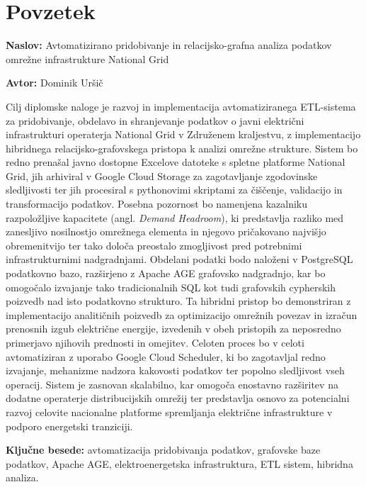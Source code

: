 \documentclass[a4paper,12pt,openright]{book}
\newcommand{\ttitle}{Avtomatizirano pridobivanje in relacijsko-grafna analiza podatkov omrežne infrastrukture National Grid}
\newcommand{\tauthor}{Dominik Uršič}
\newcommand{\tkeywords}{avtomatizacija pridobivanja podatkov, grafovske baze podatkov, Apache AGE, elektroenergetska infrastruktura, ETL sistem, hibridna analiza}
\newcommand{\clearemptydoublepage}{\newpage{\pagestyle{empty}\cleardoublepage}}
\begin{document}
{}
\chapter*{Povzetek}

\noindent\textbf{Naslov:} \ttitle
\bigskip

\noindent\textbf{Avtor:} \tauthor
\bigskip

\noindent Cilj diplomske naloge je razvoj in implementacija avtomatiziranega ETL-sistema za pridobivanje, obdelavo in shranjevanje podatkov o javni električni infrastrukturi operaterja National Grid v Združenem kraljestvu, z implementacijo hibridnega relacijsko-grafovskega pristopa k analizi omrežne strukture. Sistem bo redno prenašal javno dostopne Excelove datoteke s spletne platforme National Grid, jih arhiviral v Google Cloud Storage za zagotavljanje zgodovinske sledljivosti ter jih procesiral s pythonovimi skriptami za čiščenje, validacijo in transformacijo podatkov. Posebna pozornost bo namenjena kazalniku razpoložljive kapacitete (angl. \textit{Demand Headroom}), ki predstavlja razliko med zanesljivo nosilnostjo omrežnega elementa in njegovo pričakovano najvišjo obremenitvijo ter tako določa preostalo zmogljivost pred potrebnimi infrastrukturnimi nadgradnjami. Obdelani podatki bodo naloženi v PostgreSQL podatkovno bazo, razširjeno z Apache AGE grafovsko nadgradnjo, kar bo omogočalo izvajanje tako tradicionalnih SQL kot tudi grafovskih cypherskih poizvedb nad isto podatkovno strukturo. Ta hibridni pristop bo demonstriran z implementacijo analitičnih poizvedb za optimizacijo omrežnih povezav in izračun prenosnih izgub električne energije, izvedenih v obeh pristopih za neposredno primerjavo njihovih prednosti in omejitev.
Celoten proces bo v celoti avtomatiziran z uporabo Google Cloud Scheduler, ki bo zagotavljal redno izvajanje, mehanizme nadzora kakovosti podatkov ter popolno sledljivost vseh operacij. Sistem je zasnovan skalabilno, kar omogoča enostavno razširitev na dodatne operaterje distribucijskih omrežij ter predstavlja osnovo za potencialni razvoj celovite nacionalne platforme spremljanja električne infrastrukture v podporo energetski tranziciji.

\bigskip

\noindent\textbf{Ključne besede:} \tkeywords.
\clearemptydoublepage

{}
\end{document}
